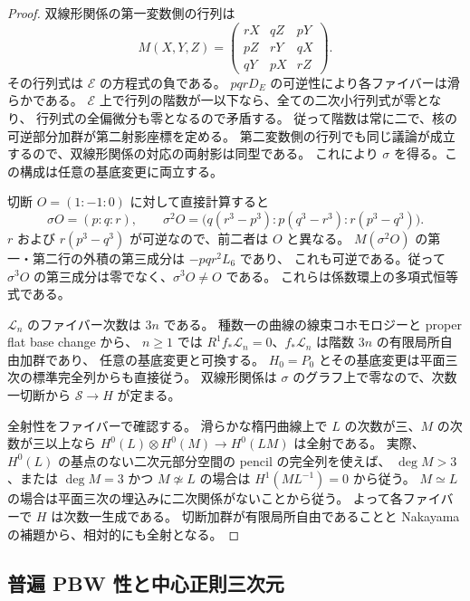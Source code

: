 \begin{proof}
双線形関係の第一変数側の行列は
\[
 M(X,Y,Z)=
 \begin{pmatrix}
 rX&qZ&pY\\pZ&rY&qX\\qY&pX&rZ
 \end{pmatrix}.
\]
その行列式は $\mathscr E$ の方程式の負である。
$pqrD_E$ の可逆性により各ファイバーは滑らかである。
$\mathscr E$ 上で行列の階数が一以下なら、全ての二次小行列式が零となり、
行列式の全偏微分も零となるので矛盾する。
従って階数は常に二で、核の可逆部分加群が第二射影座標を定める。
第二変数側の行列でも同じ議論が成立するので、双線形関係の対応の両射影は同型である。
これにより $\sigma$ を得る。この構成は任意の基底変更に両立する。

切断 $O=(1:-1:0)$ に対して直接計算すると
\[
 \sigma O=(p:q:r),\qquad
 \sigma^2O=
 \bigl(q(r^3-p^3):p(q^3-r^3):r(p^3-q^3)\bigr).
\]
$r$ および $r(p^3-q^3)$ が可逆なので、前二者は $O$ と異なる。
$M(\sigma^2O)$ の第一・第二行の外積の第三成分は $-pqr^2L_6$ であり、
これも可逆である。従って $\sigma^3O$ の第三成分は零でなく、$\sigma^3O\ne O$ である。
これらは係数環上の多項式恒等式である。

$\mathcal L_n$ のファイバー次数は $3n$ である。
種数一の曲線の線束コホモロジーと proper flat base change から、
$n\geq1$ では $R^1f_*\mathcal L_n=0$、$f_*\mathcal L_n$ は階数 $3n$ の有限局所自由加群であり、
任意の基底変更と可換する。
$H_0=P_0$ とその基底変更は平面三次の標準完全列からも直接従う。
双線形関係は $\sigma$ のグラフ上で零なので、次数一切断から $\mathscr S\to H$ が定まる。

全射性をファイバーで確認する。
滑らかな楕円曲線上で $L$ の次数が三、$M$ の次数が三以上なら
$H^0(L)\otimes H^0(M)\to H^0(LM)$ は全射である。
実際、$H^0(L)$ の基点のない二次元部分空間の pencil の完全列を使えば、
$\deg M>3$、または $\deg M=3$ かつ $M\not\simeq L$ の場合は
$H^1(ML^{-1})=0$ から従う。
$M\simeq L$ の場合は平面三次の埋込みに二次関係がないことから従う。
よって各ファイバーで $H$ は次数一生成である。
切断加群が有限局所自由であることと Nakayama の補題から、相対的にも全射となる。
\end{proof}

\subsection{普遍 PBW 性と中心正則三次元}


